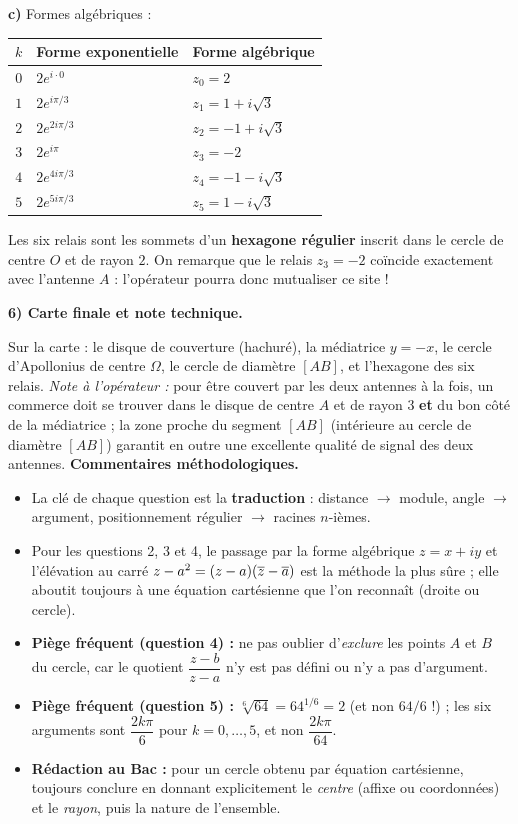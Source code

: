 \documentclass[11pt]{article}
\providecommand{\abs}{}\let\abs\relax\DeclarePairedDelimiter{\abs}{\lvert}{\rvert}
\begin{document}
\begin{exoresolu}
\textbf{c)} Formes algébriques :
\begin{center}
\begin{tabularx}{\linewidth}{|c|l|X|}
\hline
\rowcolor{popblueL} $k$ & Forme exponentielle & Forme algébrique \\
\hline
$0$ & $2e^{i\cdot 0}$ & $z_0 = 2$ \\
\hline
$1$ & $2e^{i\pi/3}$ & $z_1 = 1 + i\sqrt{3}$ \\
\hline
$2$ & $2e^{2i\pi/3}$ & $z_2 = -1 + i\sqrt{3}$ \\
\hline
$3$ & $2e^{i\pi}$ & $z_3 = -2$ \\
\hline
$4$ & $2e^{4i\pi/3}$ & $z_4 = -1 - i\sqrt{3}$ \\
\hline
$5$ & $2e^{5i\pi/3}$ & $z_5 = 1 - i\sqrt{3}$ \\
\hline
\end{tabularx}
\end{center}
Les six relais sont les sommets d'un \textbf{hexagone régulier} inscrit dans le cercle de centre $O$ et de rayon $2$. On remarque que le relais $z_3 = -2$ coïncide exactement avec l'antenne $A$ : l'opérateur pourra donc mutualiser ce site !

\textbf{6) Carte finale et note technique.}

Sur la carte : le disque de couverture (hachuré), la médiatrice $y=-x$, le cercle d'Apollonius de centre $\Omega$, le cercle de diamètre $[AB]$, et l'hexagone des six relais. \emph{Note à l'opérateur :} pour être couvert par les deux antennes à la fois, un commerce doit se trouver dans le disque de centre $A$ et de rayon $3$ \textbf{et} du bon côté de la médiatrice ; la zone proche du segment $[AB]$ (intérieure au cercle de diamètre $[AB]$) garantit en outre une excellente qualité de signal des deux antennes.
\tcblower
\textbf{Commentaires méthodologiques.}
\begin{itemize}
\item La clé de chaque question est la \textbf{traduction} : distance $\to$ module, angle $\to$ argument, positionnement régulier $\to$ racines $n$-ièmes.
\item Pour les questions 2, 3 et 4, le passage par la forme algébrique $z=x+iy$ et l'élévation au carré $\abs{z-a}^2 = (z-a)(\overline{z}-\overline{a})$ est la méthode la plus sûre ; elle aboutit toujours à une équation cartésienne que l'on reconnaît (droite ou cercle).
\item \textbf{Piège fréquent (question 4) :} ne pas oublier d'\emph{exclure} les points $A$ et $B$ du cercle, car le quotient $\dfrac{z-b}{z-a}$ n'y est pas défini ou n'y a pas d'argument.
\item \textbf{Piège fréquent (question 5) :} $\sqrt[6]{64} = 64^{1/6} = 2$ (et non $64/6$ !) ; les six arguments sont $\dfrac{2k\pi}{6}$ pour $k=0,\dots,5$, et non $\dfrac{2k\pi}{64}$.
\item \textbf{Rédaction au Bac :} pour un cercle obtenu par équation cartésienne, toujours conclure en donnant explicitement le \emph{centre} (affixe ou coordonnées) et le \emph{rayon}, puis la nature de l'ensemble.
\end{itemize}
\end{exoresolu}
\end{document}
